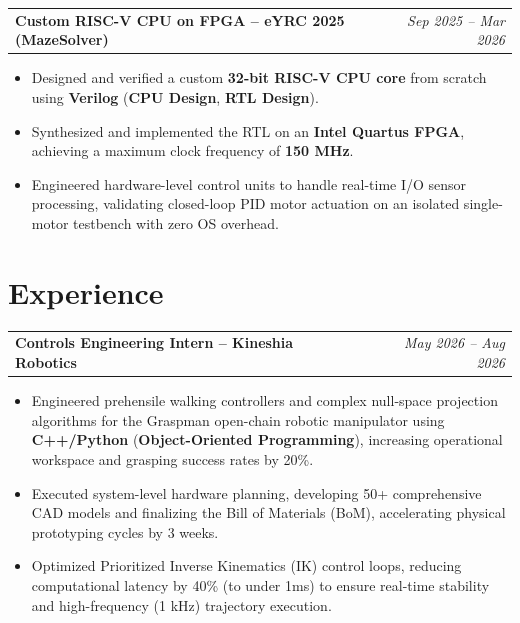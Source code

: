 \documentclass[a4paper,10.5pt]{article}
\begin{document}
\noindent
\begin{tabularx}{\linewidth}{@{}X r@{}}
\textbf{Custom RISC-V CPU on FPGA -- eYRC 2025 (MazeSolver)} & \textit{Sep 2025 -- Mar 2026} \\
\end{tabularx}
\begin{itemize}[leftmargin=1.5em, itemsep=1pt]
    \item Designed and verified a custom \textbf{32-bit RISC-V CPU core} from scratch using \textbf{Verilog} (\textbf{CPU Design}, \textbf{RTL Design}).
    \item Synthesized and implemented the RTL on an \textbf{Intel Quartus FPGA}, achieving a maximum clock frequency of \textbf{150 MHz}.
    \item Engineered hardware-level control units to handle real-time I/O sensor processing, validating closed-loop PID motor actuation on an isolated single-motor testbench with zero OS overhead.
\end{itemize}

\section*{Experience}

\noindent
\begin{tabularx}{\linewidth}{@{}X r@{}}
\textbf{Controls Engineering Intern -- Kineshia Robotics} & \textit{May 2026 -- Aug 2026} \\
\end{tabularx}
\begin{itemize}[leftmargin=1.5em, itemsep=1pt]
    \item Engineered prehensile walking controllers and complex null-space projection algorithms for the Graspman open-chain robotic manipulator using \textbf{C++/Python} (\textbf{Object-Oriented Programming}), increasing operational workspace and grasping success rates by 20\%.
    \item Executed system-level hardware planning, developing 50+ comprehensive CAD models and finalizing the Bill of Materials (BoM), accelerating physical prototyping cycles by 3 weeks.
    \item Optimized Prioritized Inverse Kinematics (IK) control loops, reducing computational latency by 40\% (to under 1ms) to ensure real-time stability and high-frequency (1 kHz) trajectory execution.
\end{itemize}

\end{document}
